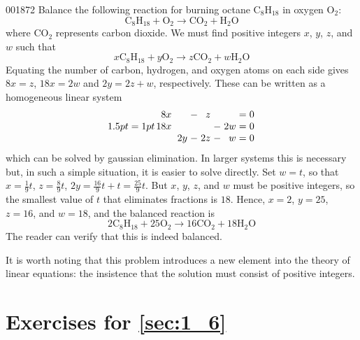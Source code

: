 \begin{example}{}{001872}
Balance the following reaction for burning octane $\mbox{C}_8\mbox{H}_{18}$ in oxygen $\mbox{O}_2$:
\begin{equation*}
\mbox{C}_8\mbox{H}_{18} + \mbox{O}_2 \rightarrow \mbox{CO}_2 + \mbox{H}_2\mbox{O}
\end{equation*}
where $\mbox{CO}_2$ represents carbon dioxide. We must find positive integers $x$, $y$, $z$, and $w$ such that
\begin{equation*}
x\mbox{C}_8\mbox{H}_{18} + y\mbox{O}_2 \rightarrow z\mbox{CO}_2 + w\mbox{H}_2\mbox{O}
\end{equation*}
Equating the number of carbon, hydrogen, and oxygen atoms on each side gives $8x = z$, $18x = 2w$ and $2y = 2z + w$, respectively. These can be written as a homogeneous linear system
\begin{equation*}
\arraycolsep=1pt
\begin{array}{rlrlrlrcr}
 	 8x &   &   & - & z &   &   & = & 0 \\
	18x &   &   &   &   & - &2w & = & 0 \\
	    &   &2y & - &2z & - & w & = & 0 
\end{array}
\end{equation*}
which can be solved by gaussian elimination. In larger systems this is 
necessary but, in such a simple situation, it is easier to solve 
directly. Set $w = t$, so that $x = \frac{1}{9}t$, $z = \frac{8}{9}t$, $2y = \frac{16}{9}t + t = \frac{25}{9}t$. But $x$, $y$, $z$, and $w$ must be positive integers, so the smallest value of $t$ that eliminates fractions is $18$. Hence, $x = 2$, $y = 25$, $z = 16$, and $w = 18$, and the balanced reaction is
\begin{equation*}
2\mbox{C}_8\mbox{H}_{18} + 25\mbox{O}_2 \rightarrow 16\mbox{CO}_2 + 18\mbox{H}_2\mbox{O}
\end{equation*}
The reader can verify that this is indeed balanced.
\end{example}

It is worth noting that this problem introduces a new element into the theory of linear equations: the insistence that the solution must consist of positive integers.

\section*{Exercises for \ref{sec:1_6}}

